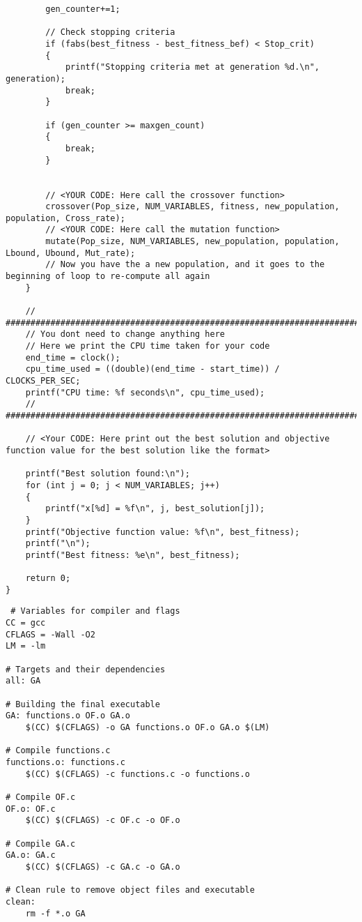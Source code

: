 \documentclass[12pt]{article}
\begin{document}
\begin{lstlisting}
        gen_counter+=1;

        // Check stopping criteria
        if (fabs(best_fitness - best_fitness_bef) < Stop_crit)
        {
            printf("Stopping criteria met at generation %d.\n", generation);
            break;
        }

        if (gen_counter >= maxgen_count)
        {
            break;
        }


        // <YOUR CODE: Here call the crossover function>
        crossover(Pop_size, NUM_VARIABLES, fitness, new_population, population, Cross_rate);
        // <YOUR CODE: Here call the mutation function>
        mutate(Pop_size, NUM_VARIABLES, new_population, population, Lbound, Ubound, Mut_rate);
        // Now you have the a new population, and it goes to the beginning of loop to re-compute all again
    }

    // ###################################################################################
    // You dont need to change anything here
    // Here we print the CPU time taken for your code
    end_time = clock();
    cpu_time_used = ((double)(end_time - start_time)) / CLOCKS_PER_SEC;
    printf("CPU time: %f seconds\n", cpu_time_used);
    // ###################################################################################

    // <Your CODE: Here print out the best solution and objective function value for the best solution like the format>

    printf("Best solution found:\n");
    for (int j = 0; j < NUM_VARIABLES; j++)
    {
        printf("x[%d] = %f\n", j, best_solution[j]);
    }
    printf("Objective function value: %f\n", best_fitness);
    printf("\n");
    printf("Best fitness: %e\n", best_fitness);

    return 0;
}

 \end{lstlisting}


 \begin{lstlisting}
 # Variables for compiler and flags
CC = gcc
CFLAGS = -Wall -O2
LM = -lm

# Targets and their dependencies
all: GA

# Building the final executable
GA: functions.o OF.o GA.o
	$(CC) $(CFLAGS) -o GA functions.o OF.o GA.o $(LM)

# Compile functions.c
functions.o: functions.c
	$(CC) $(CFLAGS) -c functions.c -o functions.o

# Compile OF.c
OF.o: OF.c
	$(CC) $(CFLAGS) -c OF.c -o OF.o

# Compile GA.c
GA.o: GA.c
	$(CC) $(CFLAGS) -c GA.c -o GA.o

# Clean rule to remove object files and executable
clean:
	rm -f *.o GA
 \end{lstlisting}
	
\end{document}

